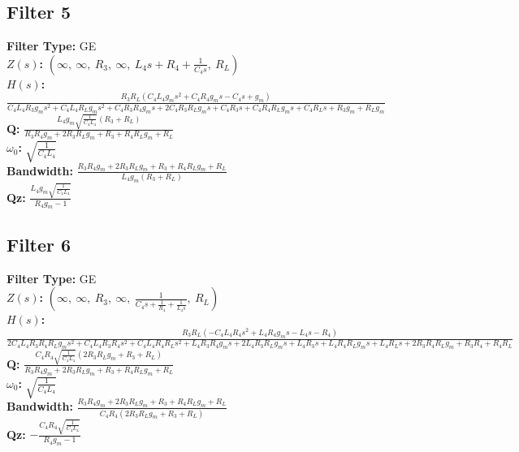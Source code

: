 \documentclass{article}
\begin{document}
\subsection*{Filter 5}
\textbf{Filter Type:} GE \\ 
\textbf{$Z(s)$:} $\left( \infty, \  \infty, \  R_{3}, \  \infty, \  L_{4} s + R_{4} + \frac{1}{C_{4} s}, \  R_{L}\right)$ \\ 
\textbf{$H(s)$:} $\frac{R_{3} R_{L} \left(C_{4} L_{4} g_{m} s^{2} + C_{4} R_{4} g_{m} s - C_{4} s + g_{m}\right)}{C_{4} L_{4} R_{3} g_{m} s^{2} + C_{4} L_{4} R_{L} g_{m} s^{2} + C_{4} R_{3} R_{4} g_{m} s + 2 C_{4} R_{3} R_{L} g_{m} s + C_{4} R_{3} s + C_{4} R_{4} R_{L} g_{m} s + C_{4} R_{L} s + R_{3} g_{m} + R_{L} g_{m}}$ \\ 
\textbf{Q:} $\frac{L_{4} g_{m} \sqrt{\frac{1}{C_{4} L_{4}}} \left(R_{3} + R_{L}\right)}{R_{3} R_{4} g_{m} + 2 R_{3} R_{L} g_{m} + R_{3} + R_{4} R_{L} g_{m} + R_{L}}$ \\ 
\textbf{$\omega_0$:} $\sqrt{\frac{1}{C_{4} L_{4}}}$ \\ 
\textbf{Bandwidth:} $\frac{R_{3} R_{4} g_{m} + 2 R_{3} R_{L} g_{m} + R_{3} + R_{4} R_{L} g_{m} + R_{L}}{L_{4} g_{m} \left(R_{3} + R_{L}\right)}$ \\ 
\textbf{Qz:} $\frac{L_{4} g_{m} \sqrt{\frac{1}{C_{4} L_{4}}}}{R_{4} g_{m} - 1}$ \\ 
\subsection*{Filter 6}
\textbf{Filter Type:} GE \\ 
\textbf{$Z(s)$:} $\left( \infty, \  \infty, \  R_{3}, \  \infty, \  \frac{1}{C_{4} s + \frac{1}{R_{4}} + \frac{1}{L_{4} s}}, \  R_{L}\right)$ \\ 
\textbf{$H(s)$:} $\frac{R_{3} R_{L} \left(- C_{4} L_{4} R_{4} s^{2} + L_{4} R_{4} g_{m} s - L_{4} s - R_{4}\right)}{2 C_{4} L_{4} R_{3} R_{4} R_{L} g_{m} s^{2} + C_{4} L_{4} R_{3} R_{4} s^{2} + C_{4} L_{4} R_{4} R_{L} s^{2} + L_{4} R_{3} R_{4} g_{m} s + 2 L_{4} R_{3} R_{L} g_{m} s + L_{4} R_{3} s + L_{4} R_{4} R_{L} g_{m} s + L_{4} R_{L} s + 2 R_{3} R_{4} R_{L} g_{m} + R_{3} R_{4} + R_{4} R_{L}}$ \\ 
\textbf{Q:} $\frac{C_{4} R_{4} \sqrt{\frac{1}{C_{4} L_{4}}} \left(2 R_{3} R_{L} g_{m} + R_{3} + R_{L}\right)}{R_{3} R_{4} g_{m} + 2 R_{3} R_{L} g_{m} + R_{3} + R_{4} R_{L} g_{m} + R_{L}}$ \\ 
\textbf{$\omega_0$:} $\sqrt{\frac{1}{C_{4} L_{4}}}$ \\ 
\textbf{Bandwidth:} $\frac{R_{3} R_{4} g_{m} + 2 R_{3} R_{L} g_{m} + R_{3} + R_{4} R_{L} g_{m} + R_{L}}{C_{4} R_{4} \left(2 R_{3} R_{L} g_{m} + R_{3} + R_{L}\right)}$ \\ 
\textbf{Qz:} $- \frac{C_{4} R_{4} \sqrt{\frac{1}{C_{4} L_{4}}}}{R_{4} g_{m} - 1}$ \\ 
\end{document}
